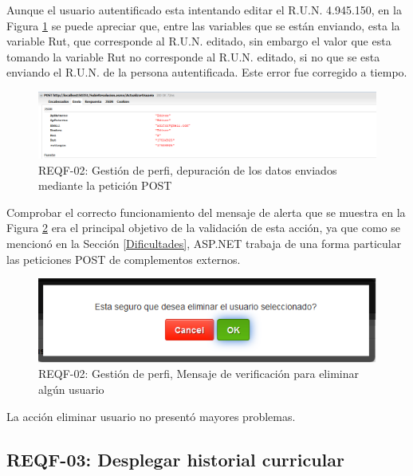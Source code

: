 Aunque el usuario autentificado esta intentando editar el  R.U.N. 4.945.150, en la Figura \ref{REQF-02-post}  se puede apreciar que, entre las variables que se están enviando, esta la variable Rut, que corresponde al R.U.N. editado, sin embargo el valor que esta tomando la variable  Rut no corresponde al R.U.N. editado, si no  que se esta enviando el R.U.N. de la persona autentificada. Este error fue corregido a tiempo.
\begin{figure}[H]
	\centering
	\includegraphics[width=1\textwidth]{images/Capitulo_5/REQF-02-post.png}
	\caption[REQF-02: Gestión de perfil, depuración de los datos enviados mediante la petición POST]{REQF-02: Gestión de perfi, depuración de los datos enviados mediante la petición POST}
	\label{REQF-02-post}
\end{figure}


Comprobar el correcto funcionamiento del mensaje de alerta que se muestra en la Figura \ref{REQF-02-eliminar} era el principal objetivo de la validación de esta acción, ya que como se mencionó en la Sección \ref{Dificultades}, ASP.NET trabaja de una forma particular las peticiones POST de complementos externos.
\begin{figure}[H]
	\centering
	\includegraphics[width=1\textwidth]{images/Capitulo_5/REQF-02-Eliminar.png}
	\caption[REQF-02: Gestión de perfil, Mensaje de verificación para eliminar algún usuario]{REQF-02: Gestión de perfi, Mensaje de verificación para eliminar algún usuario}
	\label{REQF-02-eliminar}
\end{figure}

La acción eliminar usuario no presentó mayores problemas.


\subsection{REQF-03: Desplegar historial curricular}

